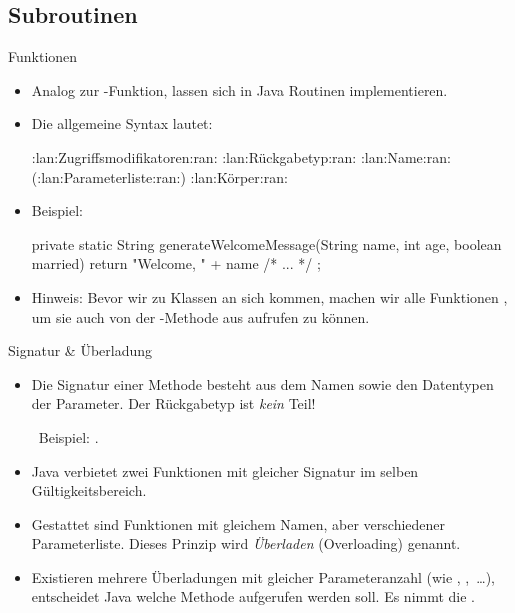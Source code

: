 \subsection{Subroutinen}
\begin{frame}[fragile]{Funktionen}
    \begin{itemize}[<+(1)->]
        \item Analog zur -Funktion, lassen sich in Java Routinen implementieren.
        \item Die allgemeine Syntax lautet:\pause{}
{\footnotesize
\begin{plainjava}
:lan:Zugriffsmodifikatoren:ran: :lan:Rückgabetyp:ran: :lan:Name:ran:(:lan:Parameterliste:ran:) {
    :lan:Körper:ran:
}
\end{plainjava}
}
        \item Beispiel: \pause{}
{\footnotesize
\begin{plainjava}
private static String generateWelcomeMessage(String name, int age,
        boolean married) {
    return "Welcome, " + name /* ... */ ;
}
\end{plainjava}
}
        \item Hinweis:\pause{} Bevor wir zu Klassen an sich kommen,\pause{} machen wir alle Funktionen ,\pause{} um sie auch von der -Methode aus aufrufen zu können.
    \end{itemize}
\end{frame}

\begin{frame}{Signatur \& Überladung}
    \begin{itemize}[<+(1)->]
        \widei
        \item Die Signatur einer Methode besteht aus dem Namen sowie den Datentypen der Parameter.\pause{} Der Rückgabetyp ist \emph{kein} Teil!\par
         \faAngleRight~Beispiel: .
        \item Java verbietet zwei Funktionen mit gleicher Signatur im selben Gültigkeitsbereich.
        \item Gestattet sind Funktionen mit gleichem Namen, aber verschiedener Parameterliste.\pause{} Dieses Prinzip wird \emph{Überladen} (Overloading) genannt.
        \item Existieren mehrere Überladungen mit gleicher Parameteranzahl\pause{} (wie , ,~\ldots),\pause{} entscheidet Java welche Methode aufgerufen werden soll.\pause{} Es nimmt die .
    \end{itemize}
\end{frame}


